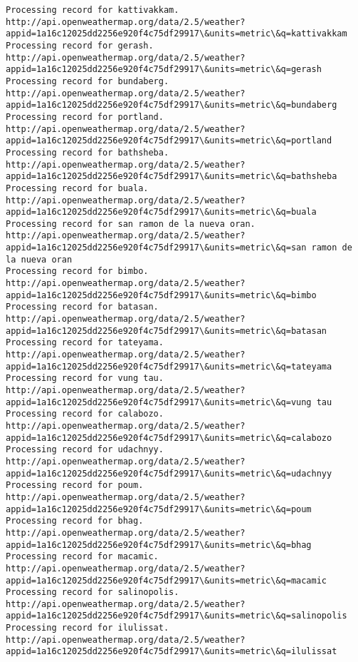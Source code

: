 \documentclass[11pt]{article}
\begin{document}
\begin{Verbatim}[commandchars=\\\{\}]
Processing record for kattivakkam.
http://api.openweathermap.org/data/2.5/weather?appid=1a16c12025dd2256e920f4c75df29917\&units=metric\&q=kattivakkam
Processing record for gerash.
http://api.openweathermap.org/data/2.5/weather?appid=1a16c12025dd2256e920f4c75df29917\&units=metric\&q=gerash
Processing record for bundaberg.
http://api.openweathermap.org/data/2.5/weather?appid=1a16c12025dd2256e920f4c75df29917\&units=metric\&q=bundaberg
Processing record for portland.
http://api.openweathermap.org/data/2.5/weather?appid=1a16c12025dd2256e920f4c75df29917\&units=metric\&q=portland
Processing record for bathsheba.
http://api.openweathermap.org/data/2.5/weather?appid=1a16c12025dd2256e920f4c75df29917\&units=metric\&q=bathsheba
Processing record for buala.
http://api.openweathermap.org/data/2.5/weather?appid=1a16c12025dd2256e920f4c75df29917\&units=metric\&q=buala
Processing record for san ramon de la nueva oran.
http://api.openweathermap.org/data/2.5/weather?appid=1a16c12025dd2256e920f4c75df29917\&units=metric\&q=san ramon de la nueva oran
Processing record for bimbo.
http://api.openweathermap.org/data/2.5/weather?appid=1a16c12025dd2256e920f4c75df29917\&units=metric\&q=bimbo
Processing record for batasan.
http://api.openweathermap.org/data/2.5/weather?appid=1a16c12025dd2256e920f4c75df29917\&units=metric\&q=batasan
Processing record for tateyama.
http://api.openweathermap.org/data/2.5/weather?appid=1a16c12025dd2256e920f4c75df29917\&units=metric\&q=tateyama
Processing record for vung tau.
http://api.openweathermap.org/data/2.5/weather?appid=1a16c12025dd2256e920f4c75df29917\&units=metric\&q=vung tau
Processing record for calabozo.
http://api.openweathermap.org/data/2.5/weather?appid=1a16c12025dd2256e920f4c75df29917\&units=metric\&q=calabozo
Processing record for udachnyy.
http://api.openweathermap.org/data/2.5/weather?appid=1a16c12025dd2256e920f4c75df29917\&units=metric\&q=udachnyy
Processing record for poum.
http://api.openweathermap.org/data/2.5/weather?appid=1a16c12025dd2256e920f4c75df29917\&units=metric\&q=poum
Processing record for bhag.
http://api.openweathermap.org/data/2.5/weather?appid=1a16c12025dd2256e920f4c75df29917\&units=metric\&q=bhag
Processing record for macamic.
http://api.openweathermap.org/data/2.5/weather?appid=1a16c12025dd2256e920f4c75df29917\&units=metric\&q=macamic
Processing record for salinopolis.
http://api.openweathermap.org/data/2.5/weather?appid=1a16c12025dd2256e920f4c75df29917\&units=metric\&q=salinopolis
Processing record for ilulissat.
http://api.openweathermap.org/data/2.5/weather?appid=1a16c12025dd2256e920f4c75df29917\&units=metric\&q=ilulissat

\end{Verbatim}
\end{document}
